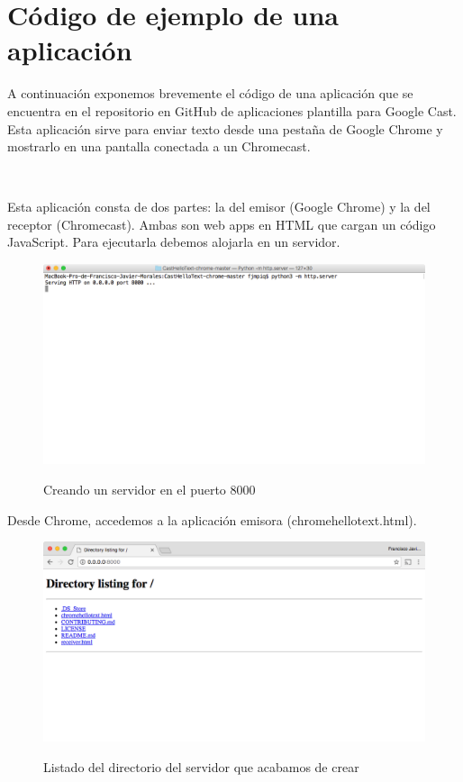 \section{Código de ejemplo de una aplicación}

A continuación exponemos brevemente el código de una aplicación que se encuentra en el repositorio en GitHub de aplicaciones plantilla para Google Cast. Esta aplicación sirve para enviar texto desde una pestaña de Google Chrome y mostrarlo en una pantalla conectada a un Chromecast.

\

Esta aplicación consta de dos partes: la del emisor (Google Chrome) y la del receptor (Chromecast).
Ambas son web apps en HTML que cargan un código JavaScript.
Para ejecutarla debemos alojarla en un servidor.

\begin{figure}[H]
	\centering
	\includegraphics[width=1.1\textwidth]{./Imagenes/creando_servidor.png}
	\label{fig:fondo}
	\caption{Creando un servidor en el puerto 8000}
\end{figure}

Desde Chrome, accedemos a la aplicación emisora (chromehellotext.html).

\begin{figure}[H]
	\centering
	\includegraphics[width=1.1\textwidth]{./Imagenes/directorylisting.png}
	\label{fig:fondo}
	\caption{Listado del directorio del servidor que acabamos de crear}
\end{figure}

